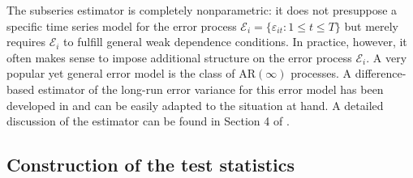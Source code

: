 \documentclass[12pt]{article}
\begin{document}
The subseries estimator is completely nonparametric: it does not presuppose a specific time series model for the error process $\mathcal{E}_i = \{ \varepsilon_{it}: 1 \le t \le T\}$ but merely requires $\mathcal{E}_i$ to fulfill general weak dependence conditions. In practice, however, it often makes sense to impose additional structure on the error process $\mathcal{E}_i$. A very popular yet general error model is the class of $\text{AR}(\infty)$ processes. A difference-based estimator of the long-run error variance for this error model has been developed in \cite{KhismatullinaVogt2020} and can be easily adapted to the situation at hand. A detailed discussion of the estimator can be found in Section 4 of \cite{KhismatullinaVogt2020}. 


\subsection{Construction of the test statistics}\label{subsec:test:stat}
\end{document}
